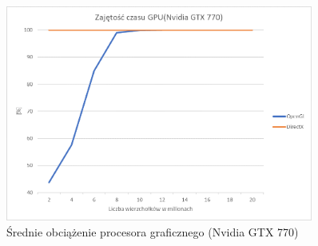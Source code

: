 \documentclass[archive]{mgr}
\begin{document}
\begin{figure}[h!]
  \centering
    \includegraphics[width=0.9\textwidth]{images/gpu/1.png}
   \caption{Średnie obciążenie procesora graficznego (Nvidia GTX 770)}
   \label{lab:71}
\end{figure}
\newpage
\end{document}
